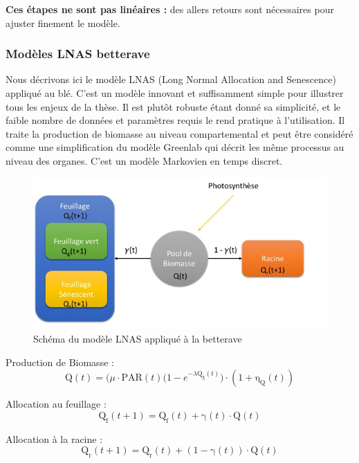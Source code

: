 \textbf{Ces étapes ne sont pas linéaires :} des allers retours sont nécessaires pour ajuster finement le modèle.

\subsubsection{Modèles LNAS betterave}

Nous décrivons ici le modèle LNAS (Long Normal Allocation and Senescence) appliqué au blé. C’est un modèle innovant et suffisamment simple pour illustrer tous les enjeux de la thèse. Il est plutôt robuste étant donné sa simplicité, et le faible nombre de données et paramètres requis le rend pratique à l’utilisation. Il traite la production de biomasse au niveau compartemental et peut être considéré comme une simplification du modèle Greenlab qui décrit les même processus au niveau des organes.
C’est un modèle Markovien en temps discret.
 
 \begin{figure}[h]
 	\begin{center}
 	
 	
   \includegraphics[scale=1.0]{./img/sBeetRoot.jpg}
   \caption{Schéma du modèle LNAS appliqué à la betterave}
   \label{fig:sBeetRoot}
   
   \end{center}
 \end{figure}
 
Production de Biomasse :
 \[ \mathrm{Q}(t) = \big(\mu\cdot\mathrm{PAR}(t)(1-e^{-\lambda\mathrm{Q_g}(t)}\big)\cdot(1+\mathrm{\eta_Q}(t)) \]
 
Allocation au feuillage :
 \[ \mathrm{Q_f}(t+1) = \mathrm{Q_f}(t) + \mathrm{\gamma}(t)\cdot\mathrm{Q}(t) \]
 
Allocation à la racine :
 \[ \mathrm{Q_r}(t+1) = \mathrm{Q_r}(t) + (1 -\mathrm{\gamma}(t))\cdot\mathrm{Q}(t) \]
 

